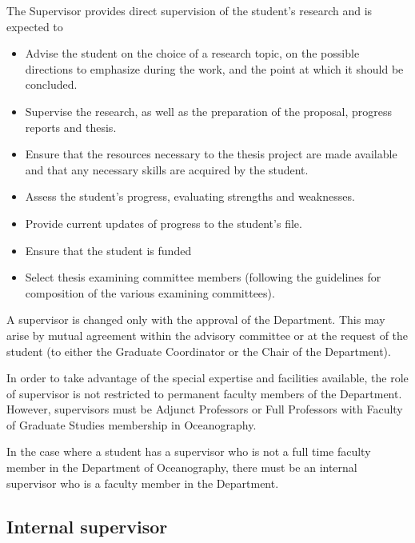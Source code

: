 \documentclass{article}
\begin{document}
The Supervisor provides direct supervision of the student's research and is expected to
\begin{itemize}
\item Advise the student on the choice of a research topic, on the possible directions to emphasize during the work, and the point at which it should be concluded.
\item Supervise the research, as well as the preparation of the proposal, progress reports and thesis.
\item Ensure that the resources necessary to the thesis project are made available and that any necessary skills are acquired by the student.
\item Assess the student's progress, evaluating strengths and weaknesses.
\item Provide current updates of progress to the student's file.
\item Ensure that the student is funded
\item Select thesis examining committee members (following the guidelines for composition of the various examining committees).
\end{itemize}

A supervisor is changed only with the approval of the Department. This may
arise by mutual agreement within the advisory committee or at the request of
the student (to either the Graduate Coordinator or the Chair of the
Department).

In order to take advantage of the special expertise and facilities available,
the role of supervisor is not restricted to permanent faculty members of the
Department. However, supervisors must be Adjunct Professors or Full Professors
with Faculty of Graduate Studies membership in Oceanography.

In the case where a student has a supervisor who is not a full time faculty
member in the Department of Oceanography, there must be an internal supervisor
who is a faculty member in the Department.

\subsection{Internal supervisor}
\end{document}
